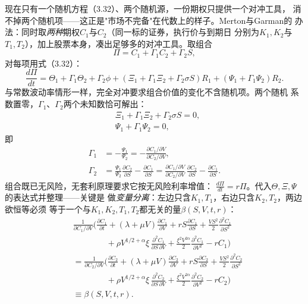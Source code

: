 现在只有一个随机方程（3.32）、两个随机源，一份期权只提供一个对冲工具，
消不掉两个随机项——这正是"市场不完备"在代数上的样子。Merton与Garman的
办法：同时取\emph{两种}期权$C_1$与$C_2$（同一标的证券，执行价与到期日
分别为$K_1,K_2$与$T_1,T_2$），加上股票本身，凑出足够多的对冲工具。取组合
\begin{equation*}
\Pi=C_{1}+\Gamma_{1}C_{2}+\Gamma_{2}S,
\end{equation*}
对每项用式（3.32）：
\begin{equation*}
\frac{d\Pi}{dt}
=\Theta_{1}+\Gamma_{1}\Theta_{2}+\Gamma_{2}\phi
+(\Xi_{1}+\Gamma_{1}\Xi_{2}+\Gamma_{2}\sigma S)R_{1}
+(\Psi_{1}+\Gamma_{1}\Psi_{2})R_{2}.
\end{equation*}
与常数波动率情形一样，完全对冲要求组合价值的变化不含随机项。两个随机
系数置零，$\Gamma_1$、$\Gamma_2$两个未知数恰可解出：
\begin{align*}
&\Xi_{1}+\Gamma_{1}\Xi_{2}+\Gamma_{2}\sigma S=0,\\
&\Psi_{1}+\Gamma_{1}\Psi_{2}=0,
\end{align*}
即
\begin{align*}
\Gamma_{1}&=-\frac{\Psi_{1}}{\Psi_{2}}
=-\frac{\partial C_{1}/\partial V}{\partial C_{2}/\partial V},\\
\Gamma_{2}&=\frac{\Psi_{1}}{\Psi_{2}}\frac{\partial C_{2}}{\partial S}
-\frac{\partial C_{1}}{\partial S}
=\frac{\partial C_{1}/\partial V}{\partial C_{2}/\partial V}
\,\frac{\partial C_{2}}{\partial S}
-\frac{\partial C_{1}}{\partial S}.
\end{align*}
组合既已无风险，无套利原理要求它按无风险利率增值：
$\frac{d\Pi}{dt}=r\Pi$。代入$\Theta,\Xi,\Psi$的表达式并整理——关键是
做\emph{变量分离}：左边只含$K_1,T_1$，右边只含$K_2,T_2$，两边欲恒等必须
等于一个与$K_1,K_2,T_1,T_2$都无关的量$\beta(S,V,t,r)$：
\begin{align*}
&\frac{1}{\partial C_{1}/\partial V}\biggl(
\frac{\partial C_{1}}{\partial t}
+(\lambda+\mu V)\frac{\partial C_{1}}{\partial V}
+rS\frac{\partial C_{1}}{\partial S}
+\frac{VS^{2}}{2}\frac{\partial^{2}C_{1}}{\partial S^{2}}\\
&\qquad\qquad+\rho V^{1/2+\alpha}\xi\,\frac{\partial^{2}C_{1}}{\partial S\,\partial V}
+\frac{\xi^{2}V^{2\alpha}}{2}\frac{\partial^{2}C_{1}}{\partial V^{2}}
-rC_{1}\biggr)\\
&=\frac{1}{\partial C_{2}/\partial V}\biggl(
\frac{\partial C_{2}}{\partial t}
+(\lambda+\mu V)\frac{\partial C_{2}}{\partial V}
+rS\frac{\partial C_{2}}{\partial S}
+\frac{VS^{2}}{2}\frac{\partial^{2}C_{2}}{\partial S^{2}}\\
&\qquad\qquad+\rho V^{1/2+\alpha}\xi\,\frac{\partial^{2}C_{2}}{\partial S\,\partial V}
+\frac{\xi^{2}V^{2\alpha}}{2}\frac{\partial^{2}C_{2}}{\partial V^{2}}
-rC_{2}\biggr)\\
&\equiv\beta(S,V,t,r).
\tag{3.33}
\end{align*}
